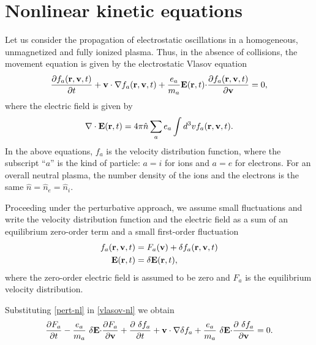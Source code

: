 \documentclass[12pt,a4paper,ruledheader]{report}
\begin{document}
\section{Nonlinear kinetic equations}
\label{sec:kin-gen-eq}
Let us consider the propagation of electrostatic oscillations
in a homogeneous, unmagnetized and fully ionized plasma. Thus,
in the absence of collisions, the movement equation is given
by the electrostatic Vlasov equation
\begin{equation}
  \label{vlasov-nl}
  \frac{\partial f_a({\bf r}, {\bf v},t)}{\partial t}
+{\bf v \cdot \nabla}f_a({\bf r}, {\bf v},t)
+\frac{e_a}{m_a}{\bf E}({\bf r},t){\bf \cdot}
\frac{\partial f_a({\bf r},{\bf v},t)}{\partial \bf v}=0,
\end{equation}
where the electric field is given by
\begin{equation}
   {\bf \nabla \cdot E}({\bf r},t)
   =4\pi \hat n \sum_a e_a\int d^3 v f_a({\bf r}, {\bf v},t). 
\end{equation}
In the above equations, $f_a$ is the velocity distribution function,
where the subscript ``$a$'' is the kind of particle: $a=i$ for ions
and $a=e$ for electrons. For an overall neutral plasma, the number
density of
the ions and the electrons is the same $\hat n = \hat n_e = \hat n_i$.

Proceeding under the perturbative approach, we assume small
fluctuations and write the velocity distribution function
and the electric field as a sum of an equilibrium zero-order
term and a small first-order fluctuation
\begin{equation}
  \label{pert-nl}
  \begin{split}
      f_a({\bf r}, {\bf v},t)&=F_a({\bf v})+\delta f_a({\bf r}, {\bf v},t)\\
  {\bf E}({\bf r},t)&=\delta {\bf E}({\bf r},t),
  \end{split}
\end{equation}
where the zero-order electric field is assumed to be zero and
$F_a$ is the equilibrium velocity distribution.

Substituting \eqref{pert-nl} in \eqref{vlasov-nl} we obtain
\begin{equation} 
  \frac{\partial F_a}{\partial t}-\frac{e_a}{m_a}\
  \delta {\bf E \cdot} \frac{\partial F_a}{\partial \bf v}
+\frac{\partial\ \delta f_a}{\partial t}+{\bf v \cdot \nabla} \delta f_a
  +\frac{e_a}{m_a}\ \delta {\bf E \cdot}
  \frac{\partial\ \delta f_a}{\partial \bf v}=0.
\label{turb_ave_vlasov}
\end{equation}
\end{document}
